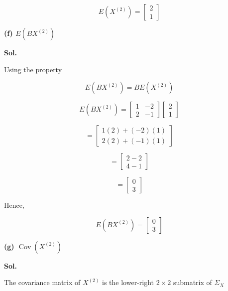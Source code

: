 \documentclass[12pt]{article}
\begin{document}
\[
\boxed{
E(X^{(2)})
=
\begin{bmatrix}
2\\
1
\end{bmatrix}
}
\]

\vspace{1cm}

\noindent
\textbf{(f) \(E(BX^{(2)})\)}

\vspace{0.5cm}

\noindent
\textbf{Sol.}

\vspace{0.3cm}

\noindent
Using the property

\[
E(BX^{(2)})
=
BE(X^{(2)})
\]

\[
E(BX^{(2)})
=
\begin{bmatrix}
1 & -2\\
2 & -1
\end{bmatrix}
\begin{bmatrix}
2\\
1
\end{bmatrix}
\]

\[
=
\begin{bmatrix}
1(2)+(-2)(1)\\
2(2)+(-1)(1)
\end{bmatrix}
\]

\[
=
\begin{bmatrix}
2-2\\
4-1
\end{bmatrix}
\]

\[
=
\begin{bmatrix}
0\\
3
\end{bmatrix}
\]

\noindent
Hence,

\[
\boxed{
E(BX^{(2)})
=
\begin{bmatrix}
0\\
3
\end{bmatrix}
}
\]

\vspace{1cm}

\noindent
\textbf{(g) \(\operatorname{Cov}(X^{(2)})\)}

\vspace{0.5cm}

\noindent
\textbf{Sol.}

\vspace{0.3cm}

\noindent
The covariance matrix of \(X^{(2)}\) is the lower-right \(2\times2\) submatrix of \(\Sigma_X\)
\end{document}
